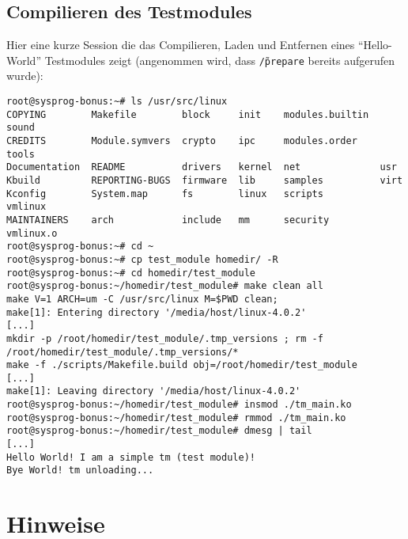 \documentclass{article}
\begin{document}
\subsection*{Compilieren des Testmodules}
Hier eine kurze Session die das Compilieren, Laden und Entfernen eines
"`Hello-World"' Testmodules zeigt (angenommen wird, dass
\texttt{\~/prepare} bereits aufgerufen wurde):
\begin{verbatim}
root@sysprog-bonus:~# ls /usr/src/linux
COPYING        Makefile        block     init    modules.builtin  sound
CREDITS        Module.symvers  crypto    ipc     modules.order    tools
Documentation  README          drivers   kernel  net              usr
Kbuild         REPORTING-BUGS  firmware  lib     samples          virt
Kconfig        System.map      fs        linux   scripts          vmlinux
MAINTAINERS    arch            include   mm      security         vmlinux.o
root@sysprog-bonus:~# cd ~
root@sysprog-bonus:~# cp test_module homedir/ -R
root@sysprog-bonus:~# cd homedir/test_module
root@sysprog-bonus:~/homedir/test_module# make clean all
make V=1 ARCH=um -C /usr/src/linux M=$PWD clean;
make[1]: Entering directory '/media/host/linux-4.0.2'
[...]
mkdir -p /root/homedir/test_module/.tmp_versions ; rm -f /root/homedir/test_module/.tmp_versions/*
make -f ./scripts/Makefile.build obj=/root/homedir/test_module
[...]
make[1]: Leaving directory '/media/host/linux-4.0.2'
root@sysprog-bonus:~/homedir/test_module# insmod ./tm_main.ko
root@sysprog-bonus:~/homedir/test_module# rmmod ./tm_main.ko
root@sysprog-bonus:~/homedir/test_module# dmesg | tail
[...]
Hello World! I am a simple tm (test module)!
Bye World! tm unloading...
\end{verbatim}

\section*{Hinweise}
\end{document}
